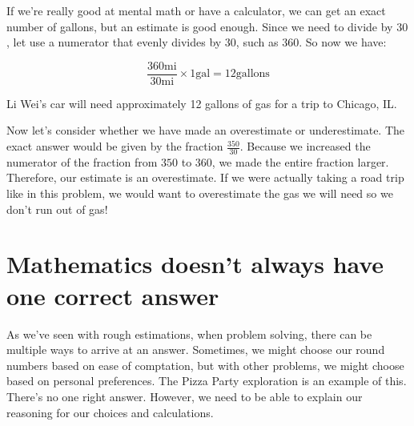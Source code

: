 \documentclass{ximera}
\begin{document}
\begin{example}
\begin{explanation}
If we're really good at mental math or have a calculator, we can get an exact number of gallons, but an estimate is good enough. Since we need to divide by $30$, let use a numerator that evenly divides by $30$, such as $360$. So now we have:

$$ \frac{360 \text{mi}}{30\text{mi}} \times{1 \text{gal}}= 12 \text{gallons}$$

Li Wei's car will need approximately 12 gallons of gas for a trip to Chicago, IL.

Now let's consider whether we have made an overestimate or underestimate.  The exact answer would be given by the fraction $\frac{350}{30}$.  Because we increased the numerator of the fraction from $350$ to $360$, we made the entire fraction larger.  Therefore, our estimate is an overestimate.  If we were actually taking a road trip like in this problem, we would want to overestimate the gas we will need so we don't run out of gas!

\end{explanation}
\end{example}

\section{Mathematics doesn't always have one correct answer}

As we've seen with rough estimations, when problem solving, there can be multiple ways to arrive at an answer. Sometimes, we might choose our round numbers based on ease of comptation, but with other problems, we might choose based on personal preferences.  The Pizza Party exploration is an example of this.  There's no one right answer. However, we need to be able to explain our reasoning for our choices and calculations.
\end{document}
